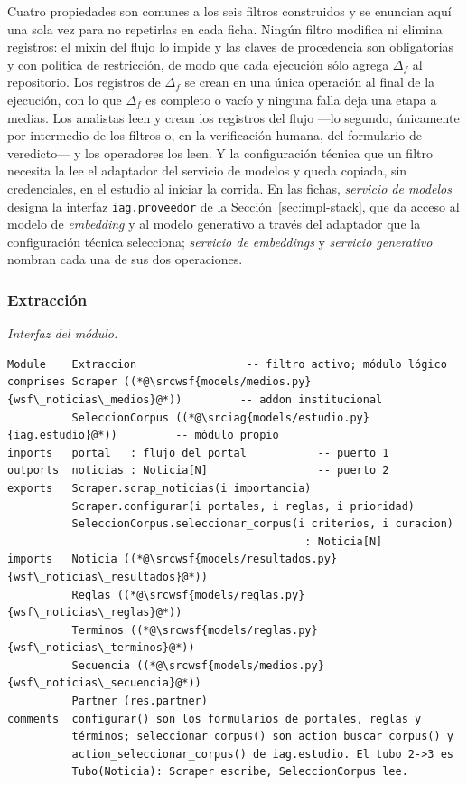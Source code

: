 \documentclass[12pt]{report}
\newcommand{\wsfrepo}{https://github.com/wsf/wsfnoticias}
\newcommand{\wsfref}{aa59c466581c0ce83c16f88f63d6021e9039fbcd}
\newcommand{\srcwsf}[2]{\href{\wsfrepo/blob/\wsfref/#1}{#2}}
\newcommand{\iagrepo}{https://github.com/lbassani12/noticias_iag}
\newcommand{\iagref}{bca7dba0bc76cf5533bd8df1d9a27493d498942d}
\newcommand{\srciag}[2]{\href{\iagrepo/blob/\iagref/#1}{#2}}
\begin{document}
Cuatro propiedades son comunes a los seis filtros construidos y se enuncian aquí una sola vez para no repetirlas en cada ficha. Ningún filtro modifica ni elimina registros: el mixin del flujo lo impide y las claves de procedencia son obligatorias y con política de restricción, de modo que cada ejecución sólo agrega \(\Delta_f\) al repositorio. Los registros de \(\Delta_f\) se crean en una única operación al final de la ejecución, con lo que \(\Delta_f\) es completo o vacío y ninguna falla deja una etapa a medias. Los analistas leen y crean los registros del flujo ---lo segundo, únicamente por intermedio de los filtros o, en la verificación humana, del formulario de veredicto--- y los operadores los leen. Y la configuración técnica que un filtro necesita la lee el adaptador del servicio de modelos y queda copiada, sin credenciales, en el estudio al iniciar la corrida. En las fichas, \textit{servicio de modelos} designa la interfaz \texttt{iag.proveedor} de la Sección~\ref{sec:impl-stack}, que da acceso al modelo de \textit{embedding} y al modelo generativo a través del adaptador que la configuración técnica selecciona; \textit{servicio de embeddings} y \textit{servicio generativo} nombran cada una de sus dos operaciones.

\subsubsection{Extracción}
\label{sec:impl-mat-extraccion}

\noindent\begin{minipage}{\linewidth}
  \textit{Interfaz del módulo.}
  \begin{lstlisting}[style=implbloque]
Module    Extraccion                 -- filtro activo; módulo lógico
comprises Scraper ((*@\srcwsf{models/medios.py}{wsf\_noticias\_medios}@*))         -- addon institucional
          SeleccionCorpus ((*@\srciag{models/estudio.py}{iag.estudio}@*))         -- módulo propio
inports   portal   : flujo del portal           -- puerto 1
outports  noticias : Noticia[N]                 -- puerto 2
exports   Scraper.scrap_noticias(i importancia)
          Scraper.configurar(i portales, i reglas, i prioridad)
          SeleccionCorpus.seleccionar_corpus(i criterios, i curacion)
                                              : Noticia[N]
imports   Noticia ((*@\srcwsf{models/resultados.py}{wsf\_noticias\_resultados}@*))
          Reglas ((*@\srcwsf{models/reglas.py}{wsf\_noticias\_reglas}@*))
          Terminos ((*@\srcwsf{models/reglas.py}{wsf\_noticias\_terminos}@*))
          Secuencia ((*@\srcwsf{models/medios.py}{wsf\_noticias\_secuencia}@*))
          Partner (res.partner)
comments  configurar() son los formularios de portales, reglas y
          términos; seleccionar_corpus() son action_buscar_corpus() y
          action_seleccionar_corpus() de iag.estudio. El tubo 2->3 es
          Tubo(Noticia): Scraper escribe, SeleccionCorpus lee.
\end{lstlisting}
\end{minipage}
\end{document}
